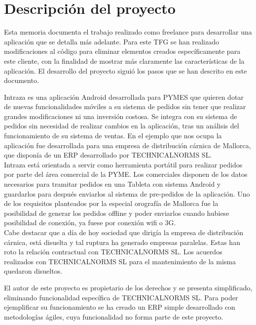 \chapter{Descripción del proyecto}
\setlength{\parindent}{2em}

Esta memoria documenta el trabajo realizado como freelance para desarrollar una aplicación que se detalla más adelante. Para este TFG se han realizado modificaciones al código para eliminar elementos creados específicamente para este cliente, con la finalidad de mostrar más claramente las características de la aplicación. El desarrollo del proyecto siguió los pasos que se han descrito en este documento. 

Intraza es una aplicación Android desarrollada para PYMES que quieren dotar de nuevas funcionalidades móviles a su sistema de pedidos sin tener que realizar grandes modificaciones ni una inversión costosa.  Se integra con su sistema de pedidos sin necesidad de realizar cambios en la aplicación, tras un análisis del funcionamiento de su sistema de ventas.  En el ejemplo que nos ocupa la aplicación fue desarrollada para una empresa de distribución cárnica de Mallorca, que disponía de un ERP desarrollado por TECHNICALNORMS SL.\\

Intraza está orientada a servir como herramienta portátil para realizar pedidos por parte del área comercial de la PYME. Los comerciales disponen de los datos necesarios para tramitar pedidos en una Tableta con sistema Android y guardarlos para después enviarlos al sistema de pre-pedidos de la aplicación. Uno de los requisitos planteados por la especial orografía de Mallorca fue la posibilidad de generar los pedidos offline y poder enviarlos cuando hubiese posibilidad de conexión, ya fuese por conexión wifi o 3G.\\

Cabe destacar que a día de hoy sociedad que dirigía la empresa de distribución cárnica, está disuelta y tal ruptura ha generado empresas paralelas. Estas han roto la relación contractual con TECHNICALNORMS SL.  Los acuerdos realizados con TECHNICALNORMS SL para el mantenimiento de la misma quedaron disueltos. 

El autor de este proyecto es propietario de los derechos y se presenta  simplificado, eliminando funcionalidad específica de TECHNICALNORMS SL. Para poder ejemplificar su funcionamiento se ha creado un ERP simple desarrollado con metodologías ágiles, cuya funcionalidad no forma parte de este proyecto.\\

